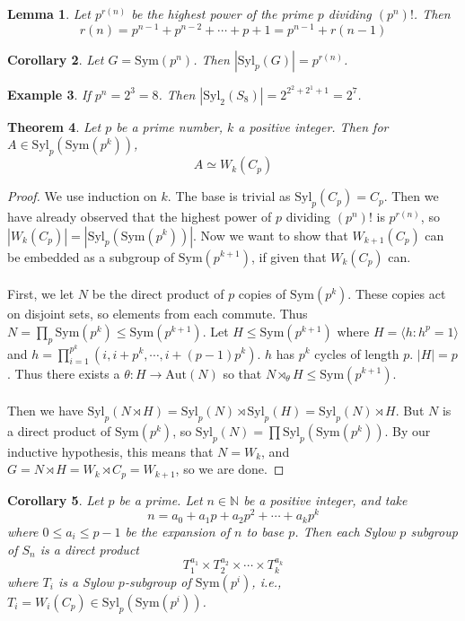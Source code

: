 \documentclass[a4paper,10pt]{article}
\newcommand{\NN}{\mathbb{N}}
\newtheorem{thm}{Theorem}
\newtheorem{Cor}[thm]{Corollary}
\newtheorem{eg}[thm]{Example}
\newtheorem{Lem}[thm]{Lemma}
\begin{document}
\begin{Lem}
Let $p^{r(n)}$ be the highest power of the prime $p$ dividing $(p^n)!$. Then
\[ r(n) = p^{n-1} + p^{n-2} + \cdots + p + 1 = p^{n-1} + r(n-1)\]
\end{Lem}

\begin{Cor}
Let $G = \text{Sym}(p^n)$. Then $| \text{Syl}_p(G)| = p^{r(n)}$. 
\end{Cor}

\begin{eg}
If $p^n = 2^3 = 8$. Then $|\text{Syl}_2(S_8)| = 2^{2^2 + 2^1 + 1} = 2^7$.
\end{eg}

\begin{thm}
Let $p$ be a prime number, $k$ a positive integer. Then for $A \in \text{Syl}_p( \text{Sym}(p^k))$, 
\[ A \simeq W_k (C_p) \]
\end{thm}

\begin{proof}
We use induction on $k$. The base is trivial as $\text{Syl}_p(C_p) = C_p$. Then we have already observed that the highest power of $p$ dividing $(p^n) !$ is $p^{r(n)}$, so $|W_k(C_p)| = |\text{Syl}_p( \text{Sym}(p^k))|$. Now we want to show that $W_{k+1}(C_p)$ can be embedded as a subgroup of $\text{Sym}(p^{k+1})$, if given that $W_k(C_p)$ can.  \\
\\
First, we let $N$ be the direct product of $p$ copies of  $\text{Sym}(p^k)$. These copies act on disjoint sets, so elements from each commute. Thus $N = \prod_p \text{Sym}(p^k) \leq \text{Sym}(p^{k+1})$. Let $H \leq \text{Sym}(p^{k+1})$ where $H = \langle h : h^p = 1 \rangle$ and $h = \prod_{i = 1}^{p^k} (i, i + p^k, \cdots, i + (p-1) p^k )$.  $h$ has $p^k$ cycles of length $p$. $|H| = p$. Thus there exists a $\theta : H \rightarrow \text{Aut}(N)$ so that $N \rtimes_\theta H \leq \text{Sym}(p^{k+1})$. \\
\\
Then we have $\text{Syl}_p(N \rtimes H) = \text{Syl}_p(N) \rtimes \text{Syl}_p(H) = \text{Syl}_p(N) \rtimes H$. But $N$ is a direct product of $\text{Sym}(p^k)$, so $\text{Syl}_p(N) = \prod \text{Syl}_p ( \text{Sym}(p^k))$. By our inductive hypothesis, this means that $N = W_k$, and $G = N \rtimes H = W_k \rtimes C_p = W_{k+1}$, so we are done.
\end{proof}

\begin{Cor}
Let $p$ be a prime. Let $n \in \NN$ be a positive integer, and take  
\[ n = a_0 + a_1 p + a_2 p^2 + \cdots + a_k p^k \]
where $0 \leq a_i \leq p-1$ be the expansion of $n$ to base $p$. Then each Sylow $p$ subgroup of $S_n$ is a direct product 
\[ T_1^{a_1} \times T_2^{a_2} \times \cdots \times T_k^{a_k} \]
where $T_i$ is a Sylow $p$-subgroup of $\text{Sym}(p^i)$, i.e., $T_i = W_i (C_p) \in \text{Syl}_p ( \text{Sym}(p^i))$. 
\end{Cor}
\end{document}
